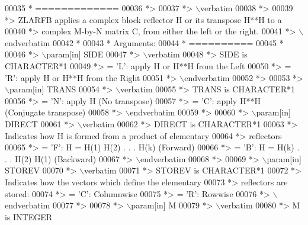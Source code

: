 \begin{DoxyCode}
00035 \textcolor{comment}{*  =============}
00036 \textcolor{comment}{*>}
00037 \textcolor{comment}{*> \(\backslash\)verbatim}
00038 \textcolor{comment}{*>}
00039 \textcolor{comment}{*> ZLARFB applies a complex block reflector H or its transpose H**H to a}
00040 \textcolor{comment}{*> complex M-by-N matrix C, from either the left or the right.}
00041 \textcolor{comment}{*> \(\backslash\)endverbatim}
00042 \textcolor{comment}{*}
00043 \textcolor{comment}{*  Arguments:}
00044 \textcolor{comment}{*  ==========}
00045 \textcolor{comment}{*}
00046 \textcolor{comment}{*> \(\backslash\)param[in] SIDE}
00047 \textcolor{comment}{*> \(\backslash\)verbatim}
00048 \textcolor{comment}{*>          SIDE is CHARACTER*1}
00049 \textcolor{comment}{*>          = 'L': apply H or H**H from the Left}
00050 \textcolor{comment}{*>          = 'R': apply H or H**H from the Right}
00051 \textcolor{comment}{*> \(\backslash\)endverbatim}
00052 \textcolor{comment}{*>}
00053 \textcolor{comment}{*> \(\backslash\)param[in] TRANS}
00054 \textcolor{comment}{*> \(\backslash\)verbatim}
00055 \textcolor{comment}{*>          TRANS is CHARACTER*1}
00056 \textcolor{comment}{*>          = 'N': apply H (No transpose)}
00057 \textcolor{comment}{*>          = 'C': apply H**H (Conjugate transpose)}
00058 \textcolor{comment}{*> \(\backslash\)endverbatim}
00059 \textcolor{comment}{*>}
00060 \textcolor{comment}{*> \(\backslash\)param[in] DIRECT}
00061 \textcolor{comment}{*> \(\backslash\)verbatim}
00062 \textcolor{comment}{*>          DIRECT is CHARACTER*1}
00063 \textcolor{comment}{*>          Indicates how H is formed from a product of elementary}
00064 \textcolor{comment}{*>          reflectors}
00065 \textcolor{comment}{*>          = 'F': H = H(1) H(2) . . . H(k) (Forward)}
00066 \textcolor{comment}{*>          = 'B': H = H(k) . . . H(2) H(1) (Backward)}
00067 \textcolor{comment}{*> \(\backslash\)endverbatim}
00068 \textcolor{comment}{*>}
00069 \textcolor{comment}{*> \(\backslash\)param[in] STOREV}
00070 \textcolor{comment}{*> \(\backslash\)verbatim}
00071 \textcolor{comment}{*>          STOREV is CHARACTER*1}
00072 \textcolor{comment}{*>          Indicates how the vectors which define the elementary}
00073 \textcolor{comment}{*>          reflectors are stored:}
00074 \textcolor{comment}{*>          = 'C': Columnwise}
00075 \textcolor{comment}{*>          = 'R': Rowwise}
00076 \textcolor{comment}{*> \(\backslash\)endverbatim}
00077 \textcolor{comment}{*>}
00078 \textcolor{comment}{*> \(\backslash\)param[in] M}
00079 \textcolor{comment}{*> \(\backslash\)verbatim}
00080 \textcolor{comment}{*>          M is INTEGER}

\end{DoxyCode}
